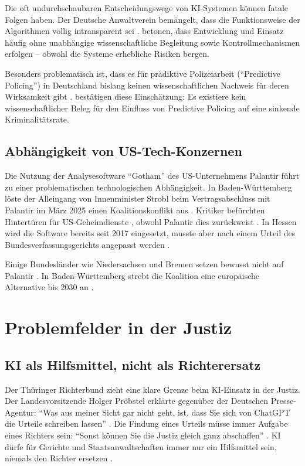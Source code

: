 \documentclass[12pt,a4paper]{article}
\begin{document}
	Die oft undurchschaubaren Entscheidungswege von KI-Systemen können fatale Folgen haben. Der Deutsche Anwaltverein bemängelt, dass die Funktionsweise der Algorithmen völlig intransparent sei \cite{DAV2025}. \cite{Peteranderl2025} betonen, dass Entwicklung und Einsatz häufig ohne unabhängige wissenschaftliche Begleitung sowie Kontrollmechanismen erfolgen – obwohl die Systeme erhebliche Risiken bergen.
	
	Besonders problematisch ist, dass es für prädiktive Polizeiarbeit (\enquote{Predictive Policing}) in Deutschland bislang keinen wissenschaftlichen Nachweis für deren Wirksamkeit gibt \cite{Peteranderl2025}. \cite{CILIP2025} bestätigen diese Einschätzung: Es existiere kein wissenschaftlicher Beleg für den Einfluss von Predictive Policing auf eine sinkende Kriminalitätsrate.
	
	\subsection{Abhängigkeit von US-Tech-Konzernen}
	
	Die Nutzung der Analysesoftware \enquote{Gotham} des US-Unternehmens Palantir führt zu einer problematischen technologischen Abhängigkeit. In Baden-Württemberg löste der Alleingang von Innenminister Strobl beim Vertragsabschluss mit Palantir im März 2025 einen Koalitionskonflikt aus \cite{FR2026}. Kritiker befürchten Hintertüren für US-Geheimdienste \cite{Focus2025}, obwohl Palantir dies zurückweist \cite{Spiegel2025}. In Hessen wird die Software bereits seit 2017 eingesetzt, musste aber nach einem Urteil des Bundesverfassungsgerichts angepasst werden \cite{FR2026}.
	
	Einige Bundesländer wie Niedersachsen und Bremen setzen bewusst nicht auf Palantir \cite{Goslarsche2025}. In Baden-Württemberg strebt die Koalition eine europäische Alternative bis 2030 an \cite{FR2026}.
	
	\section{Problemfelder in der Justiz}
	
	\subsection{KI als Hilfsmittel, nicht als Richterersatz}
	
	Der Thüringer Richterbund zieht eine klare Grenze beim KI-Einsatz in der Justiz. Der Landesvorsitzende Holger Pröbstel erklärte gegenüber der Deutschen Presse-Agentur: \enquote{Was aus meiner Sicht gar nicht geht, ist, dass Sie sich von ChatGPT die Urteile schreiben lassen} \cite{SZ2025}. Die Findung eines Urteils müsse immer Aufgabe eines Richters sein: \enquote{Sonst können Sie die Justiz gleich ganz abschaffen} \cite{SZ2025}. KI dürfe für Gerichte und Staatsanwaltschaften immer nur ein Hilfsmittel sein, niemals den Richter ersetzen \cite{SZ2025}.
	
\end{document}
